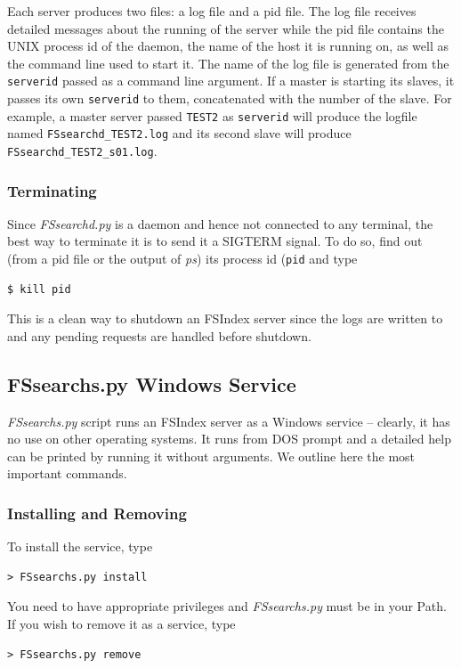 \documentclass[11pt]{article}
\begin{document}
Each server produces two files: a log file and a pid file. The log file receives detailed messages about the running of the server while the pid file contains the UNIX process id of the daemon, the name of the host it is running on, as well as the command line used to start it. The name of the log file is generated from the \texttt{serverid} passed as a command line argument. If a master is starting its slaves, it passes its own \texttt{serverid} to them, concatenated with the number of the slave. For example, a master server passed \texttt{TEST2} as \texttt{serverid} will produce the logfile named \texttt{FSsearchd\_TEST2.log} and its second slave will produce \texttt{FSsearchd\_TEST2\_s01.log}.

\subsubsection{Terminating}

Since \textit{FSsearchd.py} is a daemon and hence not connected to any terminal, the best way to terminate it is to send it a SIGTERM signal. To do so, find out (from a pid file or the output of \textit{ps}) its process id (\texttt{pid} and type
\begin{verbatim}
$ kill pid 
\end{verbatim}
This is a clean way to shutdown an FSIndex server since the logs are written to and any pending requests are handled before shutdown.

\subsection{FSsearchs.py Windows Service}\label{sec:FSservice}

\textit{FSsearchs.py} script runs an FSIndex server as a Windows service -- clearly, it has no use on other operating systems. It runs from DOS prompt and a detailed help can be printed by running it without arguments. We outline here the most important commands.

\subsubsection{Installing and Removing}
To install the service, type
\begin{verbatim}
> FSsearchs.py install 
\end{verbatim}
You need to have appropriate privileges and \textit{FSsearchs.py} must be in your Path. If you wish to remove it as a service, type
\begin{verbatim}
> FSsearchs.py remove
\end{verbatim}
\end{document}
